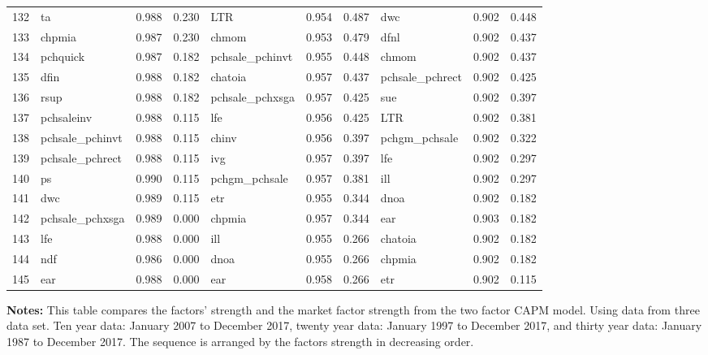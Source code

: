 \documentclass[12pt]{article}
\begin{document}
\begin{landscape}
\begin{footnotesize}
\begin{longtable}{l|lcc|lcc|lcc}
  132 & ta & 0.988 & 0.230 & LTR & 0.954 & 0.487 & dwc & 0.902 & 0.448 \\ 
  133 & chpmia & 0.987 & 0.230 & chmom & 0.953 & 0.479 & dfnl & 0.902 & 0.437 \\ 
  134 & pchquick & 0.987 & 0.182 & pchsale\_pchinvt & 0.955 & 0.448 & chmom & 0.902 & 0.437 \\ 
  135 & dfin & 0.988 & 0.182 & chatoia & 0.957 & 0.437 & pchsale\_pchrect & 0.902 & 0.425 \\ 
  136 & rsup & 0.988 & 0.182 & pchsale\_pchxsga & 0.957 & 0.425 & sue & 0.902 & 0.397 \\ 
  137 & pchsaleinv & 0.988 & 0.115 & lfe & 0.956 & 0.425 & LTR & 0.902 & 0.381 \\ 
  138 & pchsale\_pchinvt & 0.988 & 0.115 & chinv & 0.956 & 0.397 & pchgm\_pchsale & 0.902 & 0.322 \\ 
  139 & pchsale\_pchrect & 0.988 & 0.115 & ivg & 0.957 & 0.397 & lfe & 0.902 & 0.297 \\ 
  140 & ps & 0.990 & 0.115 & pchgm\_pchsale & 0.957 & 0.381 & ill & 0.902 & 0.297 \\ 
  141 & dwc & 0.989 & 0.115 & etr & 0.955 & 0.344 & dnoa & 0.902 & 0.182 \\ 
  142 & pchsale\_pchxsga & 0.989 & 0.000 & chpmia & 0.957 & 0.344 & ear & 0.903 & 0.182 \\ 
  143 & lfe & 0.988 & 0.000 & ill & 0.955 & 0.266 & chatoia & 0.902 & 0.182 \\ 
  144 & ndf & 0.986 & 0.000 & dnoa & 0.955 & 0.266 & chpmia & 0.902 & 0.182 \\ 
  145 & ear & 0.988 & 0.000 & ear & 0.958 & 0.266 & etr & 0.902 & 0.115 \\ 
   \hline

\end{longtable}

			\begin{minipage}{1.4\textwidth}
	{\footnotesize {\bf Notes:} This table compares the factors' strength and the market factor strength from the two factor CAPM model. Using data from three data set. Ten year data: January 2007 to December 2017, twenty year data: January 1997 to December 2017, and thirty year data: January 1987 to December 2017. The sequence is arranged by the factors strength in decreasing order.}
\end{minipage}
\end{footnotesize}
\end{landscape}
\end{document}
